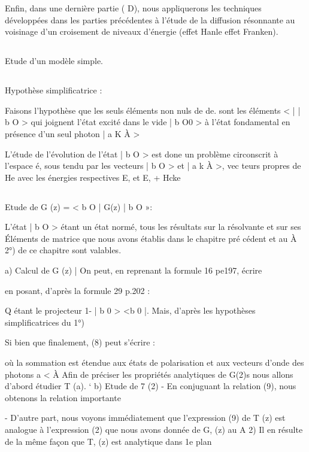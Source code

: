 Enfin, dans une dernière partie ( D), nous appliquerons les
techniques développées dans les parties précédentes à l'étude de la diffusion
résonnante au voisinage d'un croisement de niveaux d'énergie (effet Hanle
effet Franken).

\subsection{}Etude d'un modèle simple.%

\subsection{}Hypothèse simplificatrice :%

Faisons l'hypothèse que les seuls éléments non nuls de de. sont
les éléments <  |  | b O > qui joignent l'état excité dans le vide
| b O0 > à l'état fondamental en présence d'un seul photon | a K À >

L'étude de l'évolution de l'état | b O > est done un problème circonscrit à l'espace é, sous tendu par les vecteurs | b O > et | a k À >, vec
teurs propres de He avec les énergies respectives E, et E, + Hcke

\subsection{}Etude de G (z) = < b O | G(z) | b O »:%



L'état | b O > étant un état normé, tous les résultats sur la résolvante et sur ses Éléments de matrice que nous avons établis dans le chapitre pré
cédent et au  À 2°) de ce chapitre sont valables.

a) Calcul de G (z) |
On peut, en reprenant la formule 16 pe197, écrire

en posant, d'après la formule 29 p.202 :

Q étant le projecteur 1- | b 0 > <b 0 |.
Mais, d'après les hypothèses simplificatrices du 1°)

Si bien que finalement, (8) peut s'écrire :

où la sommation est étendue aux états de polarisation et aux vecteurs d'onde
des photons a < À
Afin de préciser les propriétés analytiques de G(2)s nous allons
d'abord étudier T (a). ‘
b) Etude de 7 (2)
- En conjuguant la relation (9), nous obtenons la relation
importante

- D'autre part, nous voyons immédiatement que l'expression
(9) de T (z) est analogue à l'expression (2) que nous avons donnée de G, (z) au
 A 2) Il en résulte de la même façon que T, (z) est analytique dans 1e plan

